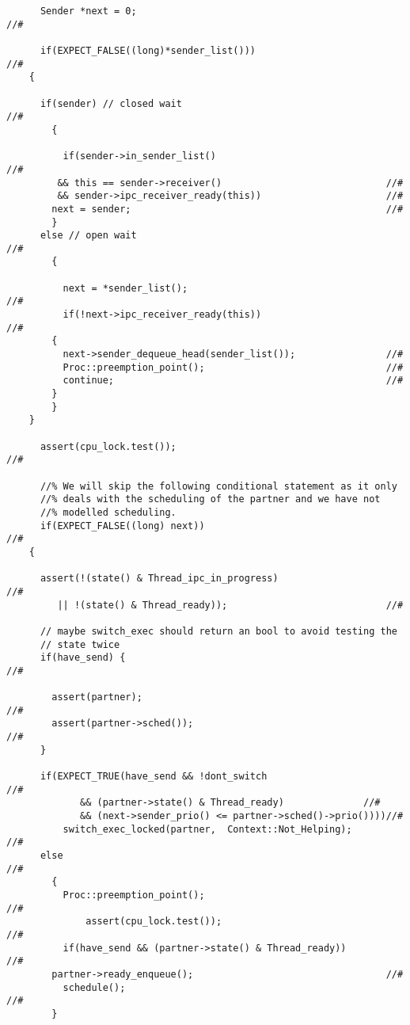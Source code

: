 \begin{lstlisting}
      Sender *next = 0;                                                    //#

      if(EXPECT_FALSE((long)*sender_list()))                               //#
	{

	  if(sender) // closed wait                                        //#
	    {
	      
	      if(sender->in_sender_list()                                  //#
		 && this == sender->receiver()                             //#
		 && sender->ipc_receiver_ready(this))                      //#
		next = sender;                                             //#
	    }
	  else // open wait                                                //#
	    {
	      
	      next = *sender_list();                                       //#
	      if(!next->ipc_receiver_ready(this))                          //#
		{
		  next->sender_dequeue_head(sender_list());                //#
		  Proc::preemption_point();                                //#
		  continue;                                                //#
		}
	    }
	}
      
      assert(cpu_lock.test());                                             //#
    
      //% We will skip the following conditional statement as it only
      //% deals with the scheduling of the partner and we have not
      //% modelled scheduling.
      if(EXPECT_FALSE((long) next))                                        //#
	{
	  
	  assert(!(state() & Thread_ipc_in_progress)                       //#
		 || !(state() & Thread_ready));                            //#
	  
	  // maybe switch_exec should return an bool to avoid testing the 
	  // state twice
	  if(have_send) {                                                  //#
	    
	    assert(partner);                                               //#
	    assert(partner->sched());                                      //#
	  }

	  if(EXPECT_TRUE(have_send && !dont_switch                         //#
			 && (partner->state() & Thread_ready)              //#
			 && (next->sender_prio() <= partner->sched()->prio())))//#
	      switch_exec_locked(partner,  Context::Not_Helping);          //#
	  else                                                             //#
	    {
	      Proc::preemption_point();                                    //#
              assert(cpu_lock.test());                                     //#
	      if(have_send && (partner->state() & Thread_ready))           //#
		partner->ready_enqueue();                                  //#
	      schedule();                                                  //#
	    }
	  

\end{lstlisting}
